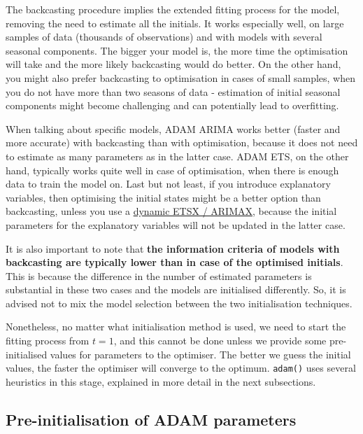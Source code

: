 \documentclass[
]{book}
\theoremstyle{definition}
\theoremstyle{definition}
\theoremstyle{definition}
\theoremstyle{definition}
\theoremstyle{remark}
\begin{document}
The backcasting procedure implies the extended fitting process for the model, removing the need to estimate all the initials. It works especially well, on large samples of data (thousands of observations) and with models with several seasonal components. The bigger your model is, the more time the optimisation will take and the more likely backcasting would do better. On the other hand, you might also prefer backcasting to optimisation in cases of small samples, when you do not have more than two seasons of data - estimation of initial seasonal components might become challenging and can potentially lead to overfitting.

When talking about specific models, ADAM ARIMA works better (faster and more accurate) with backcasting than with optimisation, because it does not need to estimate as many parameters as in the latter case. ADAM ETS, on the other hand, typically works quite well in case of optimisation, when there is enough data to train the model on. Last but not least, if you introduce explanatory variables, then optimising the initial states might be a better option than backcasting, unless you use a \protect\hyperlink{ADAMXDynamic}{dynamic ETSX / ARIMAX}, because the initial parameters for the explanatory variables will not be updated in the latter case.

It is also important to note that \textbf{the information criteria of models with backcasting are typically lower than in case of the optimised initials}. This is because the difference in the number of estimated parameters is substantial in these two cases and the models are initialised differently. So, it is advised not to mix the model selection between the two initialisation techniques.

Nonetheless, no matter what initialisation method is used, we need to start the fitting process from \(t=1\), and this cannot be done unless we provide some pre-initialised values for parameters to the optimiser. The better we guess the initial values, the faster the optimiser will converge to the optimum. \texttt{adam()} uses several heuristics in this stage, explained in more detail in the next subsections.

\hypertarget{pre-initialisation-of-adam-parameters}{%
\subsection{Pre-initialisation of ADAM parameters}\label{pre-initialisation-of-adam-parameters}}
\end{document}
